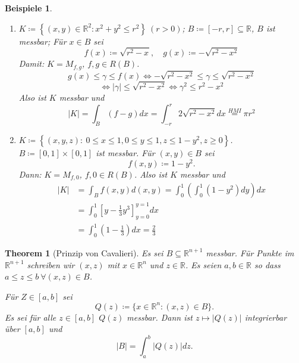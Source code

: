 \documentclass[12pt]{extreport} %
\newcommand{\R}{\mathbb{R}}
\theoremstyle{named}
\newtheorem{unnamedtheorem}{Theorem} \counterwithin{unnamedtheorem}{chapter}
\theoremstyle{nnamed}
\theoremstyle{itshape}
\theoremstyle{normal}
\newtheorem*{beispiele}{Beispiele}
\begin{document}
\begin{beispiele} ~\
	\begin{enumerate} %
		\item $K \coloneqq \left\{ (x, y) \in \R^{2}: x^{2} + y^{2} \leq r^{2} \right\} ~(r > 0)$; $B \coloneqq [-r, r] \subseteq \R$,
			 $B$ ist messbar; Für $x \in B$ sei
			 $$ f(x) \coloneqq \sqrt{r^{2} - x^{}}, \quad g(x) \coloneqq -\sqrt{r^{2} - x^{2}} $$
			 Damit: $K = M_{f,g}$, $f, g \in R(B)$.
			 $$ g(x) \leq \gamma \leq f(x) \iff -\sqrt{r^{2} - x^{2}} \leq \gamma \leq \sqrt{r^{2} - x^{2}} $$ 
			 $$ \iff |\gamma| \leq \sqrt{r^{2} - x^{2}} \iff \gamma^{2} \leq r^{2} - x^{2} $$
			 Also ist $K$ messbar und
			 $$ |K| = \int_{B} \left( f - g \right) dx = \int_{-r}^{r} 2 \sqrt{r^{2} - x^{2}} dx \overset{HMI}{=} \pi r^{2} $$
		\item $K \coloneqq \left\{ (x, y, z) \colon ~ 0 \leq x \leq 1, 0 \leq y \leq 1, z \leq 1 - y^{2}, z \geq 0 \right\}$. $B \coloneqq [0,1] \times [0,1]$ ist messbar. Für $(x, y) \in B$ sei
			$$ f(x, y) \coloneqq 1 - y^{2}. $$
			Dann: $K = M_{f, 0}$, $f, 0 \in R(B)$. Also ist $K$ messbar und 
			\begin{align*}
				|K|  & = \int_{B} f(x, y) d(x, y) = \int_{0}^{1} \left( \int_{0}^{1} \left( 1 - y^{2} \right) dy \right) dx \\
					 & = \int_{0}^{1} \left[ y - \frac{1}{3} y^{3} \right]_{y=0}^{y=1} dx \\
					 & = \int_{0}^{1} \left( 1 - \frac{1}{3} \right) dx = \frac{2}{3}
			\end{align*} %
	\end{enumerate}	
\end{beispiele}


\begin{unnamedtheorem}[Prinzip von Cavalieri] \label{20.6:satz}
	Es sei $B \subseteq \R^{n+1}$ messbar. Für Punkte im $\R^{n+1}$ schreiben wir $(x,z)$ mit $x \in \R^{n}$ und $z \in \R$. Es seien $a, b \in \R$ so dass $a \leq z \leq b ~\forall (x, z) \in B$.
	
	\bigskip
	
	Für $Z \in [a, b]$ sei 
		$$ Q(z) \coloneqq \{ x \in \R^{n} \colon (x, z) \in B \}. $$
	Es sei für alle $z \in [a, b]$ $Q(z)$ messbar. Dann ist $z \mapsto |Q(z)|$ integrierbar über $[a, b]$ und
	$$ |B| = \int_{a}^{b} |Q(z)| dz. $$
\end{unnamedtheorem}
\end{document}
